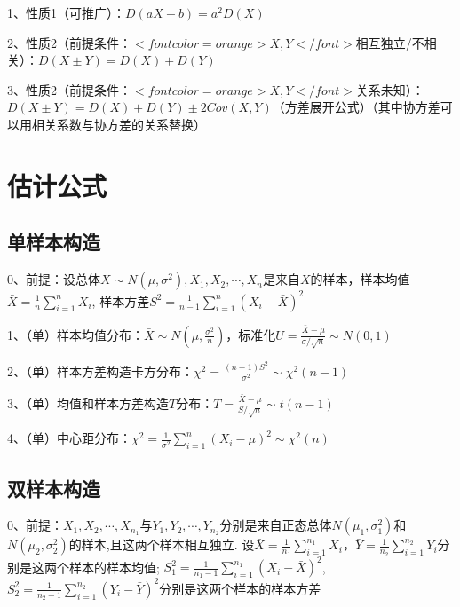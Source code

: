 1、性质1（可推广）：$ D(a X+b)=a^{2} D(X)  $

2、性质2（前提条件：$ <font color=orange>X,Y</font> $相互独立/不相关）：$ D(X \pm Y)=D(X)+D(Y) $

3、性质2（前提条件：$ <font color=orange>X,Y</font> $关系未知）：$ D ( X \pm Y ) = D ( X ) + D ( Y ) \pm 2 Cov ( X , Y )   $（方差展开公式）（其中协方差可以用相关系数与协方差的关系替换）

\section{估计公式}



\subsection{单样本构造}

0、前提：设总体$ X \sim N\left(\mu, \sigma^{2}\right), X_{1}, X_{2},\cdots, X_{n} $是来自$ X $的样本，样本均值$ \bar{X}=\frac{1}{n} \sum_{i=1}^{n} X_{i} $, 样本方差$ S^{2}=\frac{1}{n-1} \sum_{i=1}^{n}\left(X_{i}-\bar{X}\right)^{2} $

1、（单）样本均值分布：$ \bar{X} \sim N\left(\mu, \frac{\sigma^{2}}{n}\right) $，标准化$ U=\frac{\bar{X}-\mu}{\sigma / \sqrt{n}} \sim N(0,1) $

2、（单）样本方差构造卡方分布：$ \chi^{2}=\frac{(n-1) S^{2}}{\sigma^{2}} \sim \chi^{2}(n-1) $

3、（单）均值和样本方差构造$ T $分布：$ T=\frac{\bar{X}-\mu}{S / \sqrt{n}} \sim t(n-1) $

4、（单）中心距分布：$ \chi^{2}=\frac{1}{\sigma^{2}} \sum_{i=1}^{n}\left(X_{i}-\mu\right)^{2} \sim \chi^{2}(n) $



\subsection{双样本构造}

0、前提：$ X_{1}, X_{2}, \cdots, X_{n_{1}} $与$ Y_{1}, Y_{2}, \cdots,Y_{n_{2}} $分别是来自正态总体$ N\left(\mu_{1}, \sigma_{1}^{2}\right) $和$ N\left(\mu_{2}, \sigma_{2}^{2}\right) $的样本,且这两个样本相互独立. 设$ \bar{X}=\frac{1}{n_{1}} \sum_{i=1}^{n_{1}} X_{i} $，$ \bar{Y}=\frac{1}{n_{2}} \sum_{i=1}^{n_{2}} Y_{i} $分别是这两个样本的样本均值; $ S_{1}^{2}=\frac{1}{n_{1}-1} \sum_{i=1}^{n_{1}}\left(X_{i}-\bar{X}\right)^{2} $, $ S_{2}^{2}=\frac{1}{n_{2}-1} \sum_{i=1}^{n_{2}}\left(Y_{i}-\bar{Y}\right)^{2} $分别是这两个样本的样本方差

